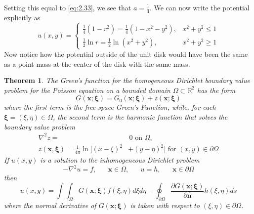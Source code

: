 \documentclass{article}
\newcommand{\R}{\mathbb{R}}
\newcommand{\pd}[2]{\frac{\partial #1}{\partial #2}}
\newcommand{\vb}[1]{\mathbf{ #1}}
\newcommand{\lap}{\nabla ^2}
\newcommand{\pull}{\! \! \!}
\newcommand{\dint}{\int \pull \int}
\newcommand{\fsgf}{G_0(\vb{x};\boldsymbol{\xi})}
\newcommand{\ggf}{G(\vb{x}; \boldsymbol{\xi})}
\newcommand{\un}{\mathbf{\hat{n}}}
\newtheorem{theorem}{Theorem}[section]
\numberwithin{equation}{section}
\begin{document}
Setting this equal to \eqref{eq:2.33}, we see that $a=\frac{1}{4}$. We can now write the potential explicitly as 
\begin{equation}
    u(x,y) = 
    \begin{cases}
        \frac{1}{4}(1-r^2) =\frac{1}{4}(1-x^2-y^2), & x^2 + y^2 \leq 1 \\
        \frac{1}{2} \ln r = \frac{1}{2}\ln (x^2+y^2), & x^2 + y^2 \geq 1
    \end{cases}
\end{equation}
Now notice how the potential outside of the unit disk would have been the same as a point mass at the center of the disk with the same mass.

\begin{theorem}
    The Green's function for the homogeneous Dirichlet boundary value problem for the Poisson equation on a bounded domain $\Omega \subset \R^2$ has the form 
    \begin{equation}
        \ggf = \fsgf+z(\vb{x};\boldsymbol{\xi}) \label{eq:2.35}
    \end{equation}
    where the first term is the free-space Green's Function, while, for each $\boldsymbol{\xi} = (\xi, \eta) \in \Omega$, the second term is the harmonic function that solves the boundary value problem
    \begin{equation}
    \begin{split}
        \lap z =&\,0 \text{ on } \Omega, \\
        z(\vb{x}, \boldsymbol{\xi})  = \frac{1}{4\pi}\ln [(x-\xi)^2&+(y-\eta)^2] \text{ for } (x,y) \in \partial \Omega
    \end{split}
    \end{equation}
    If $u(x,y)$ is a solution to the inhomogeneous Dirichlet problem 
    \begin{equation}
        -\lap u =f, \hspace{20pt} \vb{x}\in\Omega, \hspace{20pt} u =h, \hspace{20pt} \vb{x} \in\partial \Omega
    \end{equation}
    then 
    \begin{equation}
        u(x,y) = \dint_\Omega \ggf f(\xi,\eta) d\xi d\eta - \oint_{\partial \Omega} \pd{\ggf}{\un} h(\xi, \eta) ds \label{eq:2.38}
    \end{equation}
    where the normal derivative of $\ggf$ is taken with respect to $(\xi,\eta) \in \partial \Omega$.
\end{theorem}
\end{document}
